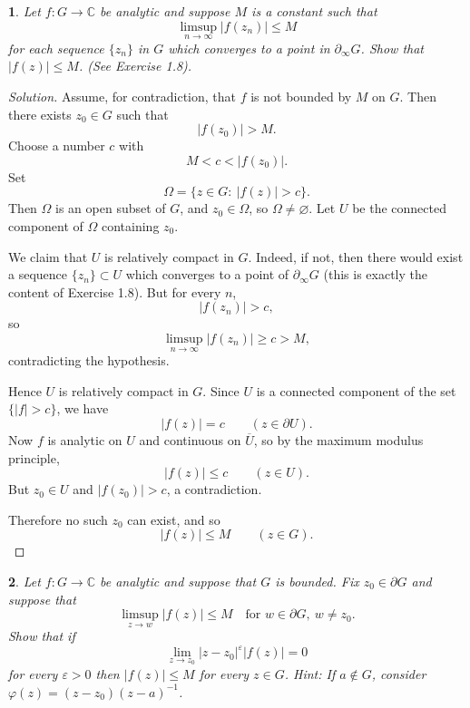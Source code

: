 \documentclass[12pt, a4paper]{report}
\theoremstyle{spaced}
\newtheorem{exercise}{}
\newcommand{\setexercise}[1]{\setcounter{exercise}{#1-1}}
\begin{document}
\setexercise{4}
\begin{exercise}
	Let $f:G\to\mathbb{C}$ be analytic and suppose $M$ is a constant such that
	\[
		\limsup_{n\to\infty} |f(z_n)| \le M
	\]
	for each sequence $\{z_n\}$ in $G$ which converges to a point in $\partial_\infty G$.
	Show that $|f(z)|\le M$. (See Exercise 1.8).
\end{exercise}
\begin{proof}[Solution]
	Assume, for contradiction, that \(f\) is not bounded by \(M\) on \(G\). Then there exists \(z_0\in G\) such that
	\[
		|f(z_0)|>M.
	\]
	Choose a number \(c\) with
	\[
		M<c<|f(z_0)|.
	\]
	Set
	\[
		\Omega=\{z\in G:\ |f(z)|>c\}.
	\]
	Then \(\Omega\) is an open subset of \(G\), and \(z_0\in \Omega\), so \(\Omega\neq\varnothing\). Let \(U\) be the connected component of \(\Omega\) containing \(z_0\).

	We claim that \(U\) is relatively compact in \(G\). Indeed, if not, then there would exist a sequence \(\{z_n\}\subset U\) which converges to a point of \(\partial_\infty G\) (this is exactly the content of Exercise 1.8). But for every \(n\),
	\[
		|f(z_n)|>c,
	\]
	so
	\[
		\limsup_{n\to\infty}|f(z_n)|\ge c>M,
	\]
	contradicting the hypothesis.

	Hence \(U\) is relatively compact in \(G\). Since \(U\) is a connected component of the set \(\{|f|>c\}\), we have
	\[
		|f(z)|=c \qquad (z\in \partial U).
	\]
	Now \(f\) is analytic on \(U\) and continuous on \(\overline U\), so by the maximum modulus principle,
	\[
		|f(z)|\le c \qquad (z\in U).
	\]
	But \(z_0\in U\) and \(|f(z_0)|>c\), a contradiction.

	Therefore no such \(z_0\) can exist, and so
	\[
		|f(z)|\le M \qquad (z\in G).
	\]
\end{proof}
\setexercise{5}
\begin{exercise}
	Let $f:G\to\mathbb{C}$ be analytic and suppose that $G$ is bounded. Fix $z_0\in\partial G$ and suppose that
	\[
		\limsup_{z\to w}|f(z)|\le M \quad \text{for } w\in\partial G,\ w\ne z_0.
	\]
	Show that if
	\[
		\lim_{z\to z_0} |z-z_0|^{\varepsilon}|f(z)|=0
	\]
	for every $\varepsilon>0$ then $|f(z)|\le M$ for every $z\in G$.
	\emph{Hint:} If $a\notin G$, consider $\varphi(z)=(z-z_0)(z-a)^{-1}$.
\end{exercise}
\end{document}
